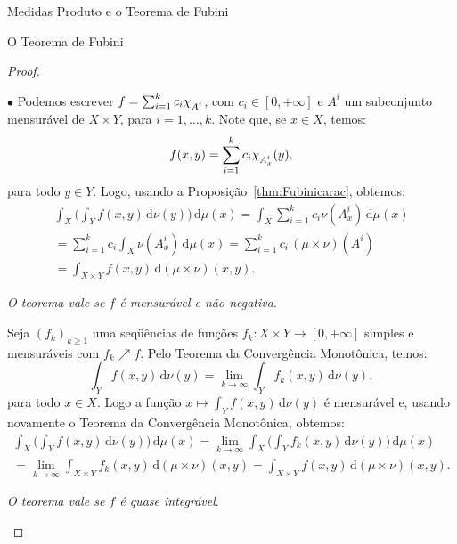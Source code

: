\documentclass[oneside,final,11pt]{amsbook}
\newcommand{\dd}{\mathrm d}
\newcommand{\chilow}[1]{\chi_{\lower2pt\hbox{$\scriptstyle#1$}}}
\newcounter{contador}
\newenvironment{bulletindent}{\setcounter{contador}{0}
\begin{list} {$\bullet$}
{\usecounter{contador}
\setlength{\leftmargin}{10pt}
\setlength{\rightmargin}{10pt}
\setlength{\labelsep}{5pt}
\setlength{\itemsep}{10pt}
\setlength{\topsep}{10pt}}}
{\end{list}}
\theoremstyle{remark}\newtheorem{exercise}{Exercício}[chapter]
\theoremstyle{remark}\newtheorem{*exercise}[exercise]{\hbox to 0pt{\hskip 0pt minus 1fil*}Exercício}
\theoremstyle{definition}\newtheorem{exdefin}{Definição}[chapter]
\theoremstyle{plain}\newtheorem{teo}{Teorema}[section]
\theoremstyle{plain}\newtheorem{lem}[teo]{Lema}
\theoremstyle{plain}\newtheorem{prop}[teo]{Proposição}
\theoremstyle{plain}\newtheorem{cor}[teo]{Corolário}
\theoremstyle{definition}\newtheorem{defin}[teo]{Definição}
\theoremstyle{remark}\newtheorem{rem}[teo]{Observação}
\theoremstyle{definition}\newtheorem{notation}[teo]{Notação}
\theoremstyle{definition}\newtheorem{convention}[teo]{Convenção}
\theoremstyle{definition}\newtheorem{example}[teo]{Exemplo}
\numberwithin{section}{chapter}
\numberwithin{equation}{section}
\begin{document}
\begin{chapter}{Medidas Produto e o Teorema de Fubini}
\begin{section}{O Teorema de Fubini}
\begin{proof}
\begin{bulletindent}
Podemos escrever $f=\sum_{i=1}^kc_i\chilow{A^i}$, com $c_i\in[0,+\infty]$ e $A^i$
um subconjunto mensurável de $X\times Y$, para $i=1,\ldots,k$. Note que,
se $x\in X$, temos:
\begin{equation}\label{eq:fxysimples2}
f(x,y)=\sum_{i=1}^kc_i\chilow{A^i_x}(y),
\end{equation}
para todo $y\in Y$. Logo, usando a Proposição~\ref{thm:Fubinicarac}, obtemos:
\begin{multline*}
\int_X\Big(\int_Yf(x,y)\,\dd\nu(y)\Big)\,\dd\mu(x)=\int_X\sum_{i=1}^kc_i\nu(A^i_x)\,\dd\mu(x)\\
=\sum_{i=1}^kc_i\int_X\nu(A^i_x)\,\dd\mu(x)
=\sum_{i=1}^kc_i\,(\mu\times\nu)(A^i)\\
=\int_{X\times Y}f(x,y)\,\dd(\mu\times\nu)(x,y).
\end{multline*}

\item {\em O teorema vale se $f$ é mensurável e não negativa}.

Seja $(f_k)_{k\ge1}$ uma seqüências de funções $f_k:X\times Y\to[0,+\infty]$
simples e mensuráveis com $f_k\nearrow f$. Pelo Teorema da Convergência Monotônica,
temos:
\[\int_Yf(x,y)\,\dd\nu(y)=\lim_{k\to\infty}\int_Yf_k(x,y)\,\dd\nu(y),\]
para todo $x\in X$. Logo a função $x\mapsto\int_Yf(x,y)\,\dd\nu(y)$
é mensurável e, usando novamente o Teorema da Convergência Monotônica, obtemos:
\begin{multline*}
\int_X\Big(\int_Yf(x,y)\,\dd\nu(y)\Big)\,\dd\mu(x)=\lim_{k\to\infty}
\int_X\Big(\int_Yf_k(x,y)\,\dd\nu(y)\Big)\,\dd\mu(x)\\
=\lim_{k\to\infty}\int_{X\times Y}f_k(x,y)\,\dd(\mu\times\nu)(x,y)
=\int_{X\times Y}f(x,y)\,\dd(\mu\times\nu)(x,y).
\end{multline*}

\item {\em O teorema vale se $f$ é quase integrável}.


\end{bulletindent}
\end{proof}
\end{section}
\end{chapter}
\end{document}
